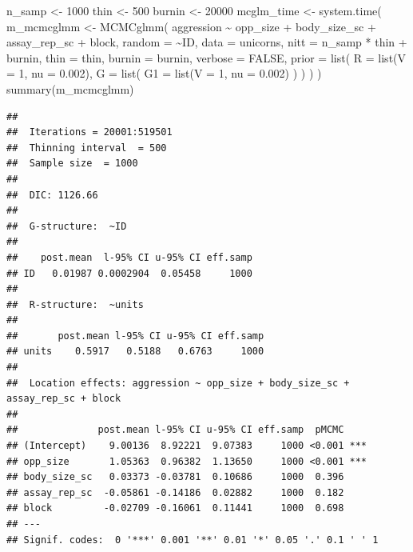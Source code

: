 \documentclass[
  12pt,
]{book}
\newenvironment{Shaded}{\begin{snugshade}}{\end{snugshade}}
\newcommand{\AttributeTok}[1]{\textcolor[rgb]{0.77,0.63,0.00}{#1}}
\newcommand{\ConstantTok}[1]{\textcolor[rgb]{0.00,0.00,0.00}{#1}}
\newcommand{\DecValTok}[1]{\textcolor[rgb]{0.00,0.00,0.81}{#1}}
\newcommand{\FloatTok}[1]{\textcolor[rgb]{0.00,0.00,0.81}{#1}}
\newcommand{\FunctionTok}[1]{\textcolor[rgb]{0.00,0.00,0.00}{#1}}
\newcommand{\NormalTok}[1]{#1}
\newcommand{\OtherTok}[1]{\textcolor[rgb]{0.56,0.35,0.01}{#1}}
\newcommand{\SpecialCharTok}[1]{\textcolor[rgb]{0.00,0.00,0.00}{#1}}
\begin{document}
\begin{Shaded}
\begin{Highlighting}[]
\NormalTok{n\_samp }\OtherTok{\textless{}{-}} \DecValTok{1000}
\NormalTok{thin }\OtherTok{\textless{}{-}} \DecValTok{500}
\NormalTok{burnin }\OtherTok{\textless{}{-}} \DecValTok{20000}
\NormalTok{mcglm\_time }\OtherTok{\textless{}{-}} \FunctionTok{system.time}\NormalTok{(}
\NormalTok{  m\_mcmcglmm }\OtherTok{\textless{}{-}} \FunctionTok{MCMCglmm}\NormalTok{(}
\NormalTok{    aggression }\SpecialCharTok{\textasciitilde{}}\NormalTok{ opp\_size }\SpecialCharTok{+}\NormalTok{ body\_size\_sc }\SpecialCharTok{+}\NormalTok{ assay\_rep\_sc }\SpecialCharTok{+}\NormalTok{ block,}
    \AttributeTok{random =} \SpecialCharTok{\textasciitilde{}}\NormalTok{ID,}
    \AttributeTok{data =}\NormalTok{ unicorns,}
    \AttributeTok{nitt =}\NormalTok{ n\_samp }\SpecialCharTok{*}\NormalTok{ thin }\SpecialCharTok{+}\NormalTok{ burnin, }\AttributeTok{thin =}\NormalTok{ thin, }\AttributeTok{burnin =}\NormalTok{ burnin,}
    \AttributeTok{verbose =} \ConstantTok{FALSE}\NormalTok{,}
    \AttributeTok{prior =} \FunctionTok{list}\NormalTok{(}
      \AttributeTok{R =} \FunctionTok{list}\NormalTok{(}\AttributeTok{V =} \DecValTok{1}\NormalTok{, }\AttributeTok{nu =} \FloatTok{0.002}\NormalTok{),}
      \AttributeTok{G =} \FunctionTok{list}\NormalTok{(}
        \AttributeTok{G1 =} \FunctionTok{list}\NormalTok{(}\AttributeTok{V =} \DecValTok{1}\NormalTok{, }\AttributeTok{nu =} \FloatTok{0.002}\NormalTok{)}
\NormalTok{      )}
\NormalTok{    )}
\NormalTok{  )}
\NormalTok{)}
\FunctionTok{summary}\NormalTok{(m\_mcmcglmm)}
\end{Highlighting}
\end{Shaded}

\begin{verbatim}
## 
##  Iterations = 20001:519501
##  Thinning interval  = 500
##  Sample size  = 1000 
## 
##  DIC: 1126.66 
## 
##  G-structure:  ~ID
## 
##    post.mean  l-95% CI u-95% CI eff.samp
## ID   0.01987 0.0002904  0.05458     1000
## 
##  R-structure:  ~units
## 
##       post.mean l-95% CI u-95% CI eff.samp
## units    0.5917   0.5188   0.6763     1000
## 
##  Location effects: aggression ~ opp_size + body_size_sc + assay_rep_sc + block 
## 
##              post.mean l-95% CI u-95% CI eff.samp  pMCMC    
## (Intercept)    9.00136  8.92221  9.07383     1000 <0.001 ***
## opp_size       1.05363  0.96382  1.13650     1000 <0.001 ***
## body_size_sc   0.03373 -0.03781  0.10686     1000  0.396    
## assay_rep_sc  -0.05861 -0.14186  0.02882     1000  0.182    
## block         -0.02709 -0.16061  0.11441     1000  0.698    
## ---
## Signif. codes:  0 '***' 0.001 '**' 0.01 '*' 0.05 '.' 0.1 ' ' 1
\end{verbatim}
\end{document}
